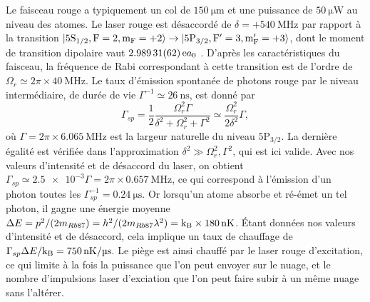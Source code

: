 Le faisceau rouge a typiquement un col de $\SI{150}{\um}$ et une puissance de $\SI{50}{\micro\watt}$ au niveau des atomes.
Le laser rouge est désaccordé de $\delta=+\SI{540}{\MHz}$ par rapport à la transition $ \ket{\mathrm{5S_{1/2},F=2,m_F=+2}} \rightarrow \ket{\mathrm{5P_{3/2},F'=3,m_F'=+3}}$, dont le moment de transition dipolaire vaut $\SI{2.98931 (62)} ea_0$ \cite{DATA_STECKRB87}.
D'après les caractéristiques du faisceau, la fréquence de Rabi correspondant à cette transition est de l'ordre de $\Omega_r \simeq 2\pi\times \SI{40}{\MHz}$.
Le taux d'émission spontanée de photons rouge par le niveau intermédiaire, de durée de vie $\Gamma^{-1} \simeq \SI{26}{\ns}$, est donné par
\begin{equation}
\label{eq:scattering_5P3/2}
\Gamma_{sp} = \frac{1}{2} \frac{\Omega_r^2 \Gamma}{\delta^2 + \Omega_r^2 + \Gamma^2}
\simeq \frac{\Omega_r^2}{2\delta^2} \Gamma,
\end{equation}
où $\Gamma = 2\pi \times \SI{6.065}{\MHz}$ est la largeur naturelle du niveau $\mathrm{5P_{3/2}}$.
La dernière égalité est vérifiée dans l'approximation $\delta^2 \gg \Omega_r^2, \Gamma^2$, qui est ici valide.
Avec nos valeurs d'intensité et de désaccord du laser, on obtient $\Gamma_{sp} \simeq \num{2.5e-3} \Gamma = 2\pi\times \SI{0.657}{\MHz}$, ce qui correspond à l'émission d'un photon  toutes les $\Gamma_{sp}^{-1} = \SI{0.24}{\us}$.
Or lorsqu'un atome absorbe et ré-émet un tel photon, il gagne une énergie moyenne
$\Delta E = p^2/(2m_{Rb87}) = h^2/(2m_{Rb87} \lambda^2) = \mathrm{k_B}\times\SI{180}{\nano\kelvin}$.
Étant données nos valeurs d'intensité et de désaccord, cela implique un taux de chauffage de $\Gamma_{sp}\Delta E /\kb = \SI{750}{\nano\K/\us}$.
Le piège est ainsi chauffé par le laser rouge d'excitation, ce qui limite à la fois la puissance que l'on peut envoyer sur le nuage, et le nombre d'impulsions laser d'exciation que l'on peut faire subir à un même nuage sans l'altérer.

